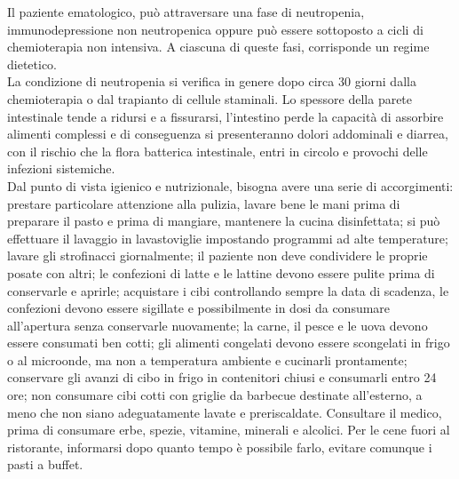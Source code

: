 Il paziente ematologico, può attraversare una fase di neutropenia, immunodepressione non neutropenica oppure può essere 
sottoposto a cicli di chemioterapia non intensiva\cite{DIETA}. A ciascuna di queste fasi, corrisponde un regime dietetico.\\
La condizione di neutropenia si verifica in genere dopo circa 30 giorni dalla chemioterapia o dal trapianto di 
cellule staminali. Lo spessore della parete intestinale tende a ridursi e a fissurarsi, l’intestino perde la capacità 
di assorbire alimenti complessi e di conseguenza si presenteranno dolori addominali e diarrea, con il 
rischio che la flora batterica intestinale, entri in circolo e provochi delle infezioni sistemiche\cite{DIETA}.\\ Dal punto di vista 
igienico e nutrizionale, bisogna avere una serie di accorgimenti: prestare particolare attenzione alla 
pulizia, lavare bene le mani prima di preparare il pasto e prima di mangiare, mantenere la cucina disinfettata; si può 
effettuare il lavaggio in lavastoviglie impostando programmi ad alte temperature;
lavare gli strofinacci giornalmente; il paziente non deve condividere le proprie posate con altri; 
le confezioni di latte e le lattine devono essere pulite prima di conservarle e aprirle; 
acquistare i cibi controllando sempre la data di scadenza, le confezioni devono essere sigillate e possibilmente 
in dosi da consumare all’apertura senza conservarle nuovamente; 
la carne, il pesce e le uova devono essere consumati ben cotti; gli alimenti congelati devono essere scongelati in 
frigo o al microonde, ma non a temperatura ambiente e cucinarli prontamente; conservare gli avanzi di cibo 
in frigo in contenitori chiusi e consumarli entro 24 ore; 
non consumare cibi cotti con griglie da barbecue destinate all’esterno, a meno che 
non siano adeguatamente lavate e preriscaldate. Consultare il medico, prima di consumare erbe, spezie, vitamine, 
minerali e alcolici. Per le cene fuori al ristorante, informarsi dopo quanto tempo è possibile farlo, evitare comunque 
i pasti a buffet\cite{DIETA}.\\

